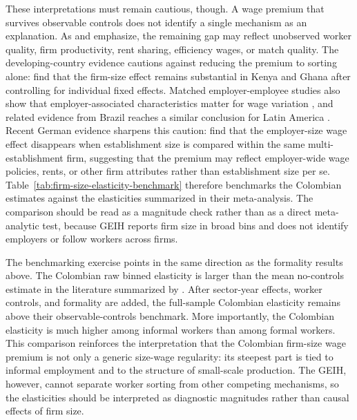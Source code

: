 These interpretations must remain cautious, though. A wage premium that survives observable controls does not identify a single mechanism as an explanation. As \citet{BrownMedoff1989} and \citet{OiIdson1999} emphasize, the remaining gap may reflect unobserved worker quality, firm productivity, rent sharing, efficiency wages, or match quality. The developing-country evidence cautions against reducing the premium to sorting alone: \citet{SoderbomTealWambugu2005} find that the firm-size effect remains substantial in Kenya and Ghana after controlling for individual fixed effects. Matched employer-employee studies also show that employer-associated characteristics matter for wage variation \citep{AbowdKramarzMargolis1999,CardHeiningKline2013,Song2019}, and related evidence from Brazil reaches a similar conclusion for Latin America \citep{AlvarezBenguriaEngbomMoser2018,GerardLagosSeverniniCard2021, EngbomMoser2022}. Recent German evidence sharpens this caution: \citet{DiegmannMullerSchoefer2026} find that the employer-size wage effect disappears when establishment size is compared within the same multi-establishment firm, suggesting that the premium may reflect employer-wide wage policies, rents, or other firm attributes rather than establishment size per se. Table~\ref{tab:firm-size-elasticity-benchmark} therefore benchmarks the Colombian estimates against the elasticities summarized in their meta-analysis. The comparison should be read as a magnitude check rather than as a direct meta-analytic test, because GEIH reports firm size in broad bins and does not identify employers or follow workers across firms.



The benchmarking exercise points in the same direction as the formality results above. The Colombian raw binned elasticity is larger than the mean no-controls estimate in the literature summarized by \citet{DiegmannMullerSchoefer2026}. After sector-year effects, worker controls, and formality are added, the full-sample Colombian elasticity remains above their observable-controls benchmark. More importantly, the Colombian elasticity is much higher among informal workers than among formal workers. This comparison reinforces the interpretation that the Colombian firm-size wage premium is not only a generic size-wage regularity: its steepest part is tied to informal employment and to the structure of small-scale production. The GEIH, however, cannot separate worker sorting from other competing mechanisms, so the elasticities should be interpreted as diagnostic magnitudes rather than causal effects of firm size.

